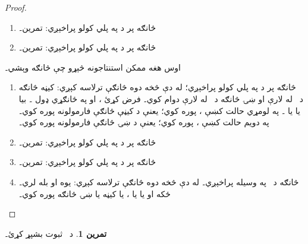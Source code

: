 \documentclass[12pt,a4paper,oneside]{report}
\theoremstyle{definition}
\newtheorem{prob}[thm]{تمرين}
\begin{document}
\begin{proof}
\begin{enumerate}
\label{olpseg:OLP-0109-B018:start}
د  له مخې\linebreak
  ۔ د  له مخې
  ۔ ځکه  يوه تړلے فارمول ده، د
   له مخې
  ؛ يعنې ،
   پوره کوي۔
\item څانګه پر \LR{$\sFmla{\True}{\lexists[x][!B(x)]} \in \Gamma$} د
  \LR{$\TRule{\True}{\lexists}$} په پلي کولو پراخېږي: تمرين۔
\item څانګه پر \LR{$\sFmla{\False}{\lexists[x][!B(x)]} \in \Gamma$} د
  \LR{$\TRule{\False}{\lexists}$} په پلي کولو پراخېږي: تمرين۔
\end{enumerate}
اوس هغه ممکن استنتاجونه څېړو چې څانګه وېشي۔
\begin{enumerate}
\item څانګه پر  د
  \LR{$\TRule{\False}{\land}$} په پلي کولو پراخېږي؛ له دې څخه دوه څانګې
  ترلاسه کېږي: کيڼه څانګه د~ له لارې او ښۍ
  څانګه د~ له لارې دوام کوي۔ فرض کړئ
  ، او په ځانګړي ډول
  ۔ بيا يا
   يا
  ۔ په لومړي حالت کښې
  ،
   پوره کوي؛ يعنې
   د کيڼې څانګې فارمولونه
  پوره کوي۔ په دويم حالت کښې
  ،
   پوره کوي؛ يعنې
   د ښۍ څانګې فارمولونه
  پوره کوي۔
\item څانګه پر  د
  \LR{$\TRule{\True}{\lor}$} په پلي کولو پراخېږي: تمرين۔
\item څانګه پر  د
  \LR{$\TRule{\True}{\lif}$} په پلي کولو پراخېږي: تمرين۔
\item څانګه د~\Cut{} په وسيله پراخېږي۔ له دې څخه دوه څانګې ترلاسه
  کېږي: يوه  او بله  لري۔
  ځکه  او يا
   يا
  ،
   يا کيڼه يا ښۍ څانګه پوره
  کوي۔
\end{enumerate}
\end{proof}
\label{olpseg:OLP-0109-B018:end}

\label{olpseg:OLP-0109-B019:start}
\begin{prob}
د~ ثبوت بشپړ کړئ۔
\end{prob}
\label{olpseg:OLP-0109-B019:end}
\end{document}
